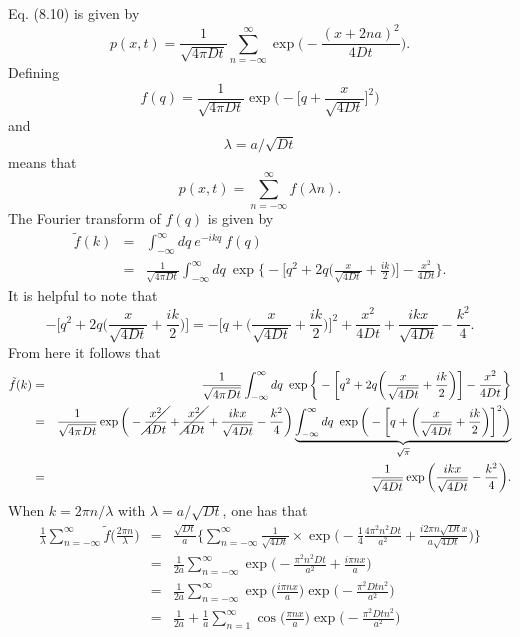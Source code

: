 Eq. (8.10) is given by
\begin{equation}
p(x,t) = \frac{1}{\sqrt{4 \pi D t}} \sum_{n=-\infty}^{\infty} \exp \bigg( -\frac{(x+2na)^2}{4Dt} \bigg). \nonumber
\end{equation}
Defining
\begin{equation}
f(q) = \frac{1}{\sqrt{4 \pi D t}} \exp \bigg( -\bigg[q + \frac{x}{\sqrt{4Dt}}\bigg]^2 \bigg) \nonumber
\end{equation}
and 
\begin{equation}
\lambda = a/\sqrt{Dt} \nonumber
\end{equation} 
means that
\begin{equation}
p(x,t)=\sum_{n=-\infty}^{\infty} f(\lambda n). \nonumber
\end{equation}
The Fourier transform of $f(q)$ is given by
\begin{eqnarray}
\tilde{f}(k) &=& \int_{-\infty}^{\infty} dq~e^{-i k q}~f(q) \nonumber \\
&=& \frac{1}{\sqrt{4 \pi D t}} \int_{-\infty}^{\infty} dq~\exp\bigg\{-\bigg[q^2 + 2q\bigg(\frac{x}{\sqrt{4Dt}} + \frac{ik}{2}\bigg)\bigg]-\frac{x^2}{4Dt}\bigg\}. \nonumber
\end{eqnarray}
It is helpful to note that
\begin{equation}
-\bigg[q^2 + 2q\bigg(\frac{x}{\sqrt{4Dt}} + \frac{ik}{2}\bigg)\bigg] = -\bigg[q+\bigg(\frac{x}{\sqrt{4Dt}} + \frac{ik}{2}\bigg) \bigg]^2 + \frac{x^2}{4Dt}+ \frac{i k x}{\sqrt{4Dt}} - \frac{k^2}{4}.
\end{equation}
From here it follows that
\begin{eqnarray}
\tilde{f}(k)&=& \frac{1}{\sqrt{4 \pi D t}} \int_{-\infty}^{\infty} dq~\exp\bigg\{-\bigg[q^2 + 2q\bigg(\frac{x}{\sqrt{4Dt}} + \frac{ik}{2}\bigg)\bigg]-\frac{x^2}{4Dt}\bigg\} \nonumber \\
&=& \frac{1}{\sqrt{4 \pi D t}} \exp\bigg(-\cancel{\frac{x^2}{4Dt}} + \cancel{\frac{x^2}{4Dt}} + \frac{ikx}{\sqrt{4Dt}} - \frac{k^2}{4}\bigg) \underbrace{\int_{-\infty}^{\infty} dq~\exp\bigg(-\bigg[q + \bigg(\frac{x}{\sqrt{4Dt}} + \frac{ik}{2}\bigg)\bigg]^2\bigg)}_{\sqrt{\pi}} \nonumber \\
&=& \frac{1}{\sqrt{4 D t}} \exp\bigg(\frac{ikx}{\sqrt{4Dt}} - \frac{k^2}{4}\bigg).
\end{eqnarray}
When $k=2\pi n/\lambda$ with $\lambda = a/\sqrt{Dt}$, one has that
\begin{eqnarray}
\frac{1}{\lambda} \sum_{n=-\infty}^{\infty} \tilde{f}\bigg(\frac{2 \pi n}{\lambda}\bigg) &=& \frac{\sqrt{Dt}}{a} \bigg\{ \sum_{n=-\infty}^{\infty} \frac{1}{\sqrt{4 D t}} \times \exp \bigg( - \frac{1}{4} \frac{4 \pi^2 n^2 D t}{a^2} + \frac{i 2 \pi n \sqrt{Dt} x}{a \sqrt{4Dt}} \bigg) \bigg\} \nonumber \\
&=&  \frac{1}{2a} \sum_{n=-\infty}^{\infty} \exp \bigg( - \frac{ \pi^2 n^2 Dt}{a^2} + \frac{i \pi nx}{a} \bigg) \nonumber \\
&=&  \frac{1}{2a} \sum_{n=-\infty}^{\infty} \exp\bigg(\frac{i \pi nx}{a} \bigg) \exp \bigg( - \frac{ \pi^2 D t n^2}{a^2}\bigg)  \nonumber \\
&=&  \frac{1}{2a} + \frac{1}{a} \sum_{n=1}^{\infty} \cos\bigg( \frac{ \pi nx}{a} \bigg) \exp \bigg( - \frac{ \pi^2 D t n^2}{a^2}\bigg) \nonumber
\end{eqnarray}
